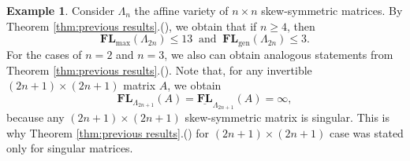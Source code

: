 \documentclass[reqno]{amsart}
\theoremstyle{definition}
\newtheorem{example}[theorem]{Example}
\numberwithin{equation}{section}
\begin{document}
\begin{example}\label{ex:Skew-symmetric Structure}
    Consider $\Lambda_n$ the affine variety of $n \times n$ skew-symmetric matrices. By Theorem \ref{thm:previous results}.(), we obtain that if $n \geq 4$, then
    \begin{equation*}
        \mathbf{FL}_{\text{max}}(\Lambda_{2n}) \leq 13~\text{ and }~\mathbf{FL}_{\text{gen}}(\Lambda_{2n}) \leq 3.
    \end{equation*}
    For the cases of $n=2$ and $n=3$, we also can obtain analogous statements from Theorem \ref{thm:previous results}.(). Note that, for any invertible $(2n+1) \times (2n+1)$ matrix $A$, we obtain
    \begin{equation*}
        \mathbf{FL}_{\Lambda_{2n+1}}(A)=\underline{\mathbf{FL}}_{\Lambda_{2n+1}}(A)=\infty,
    \end{equation*}
    because any $(2n+1) \times (2n+1)$ skew-symmetric matrix is singular. This is why Theorem \ref{thm:previous results}.() for $(2n+1) \times (2n+1)$ case was stated only for singular matrices.
    

\end{example}
\end{document}
